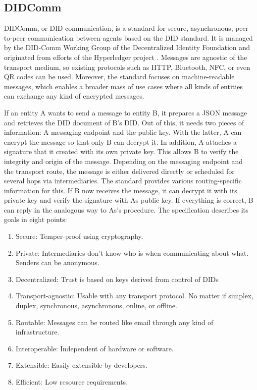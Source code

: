 		\subsection{DIDComm}
		
		DIDComm, or \ac{DID} communication, is a standard for secure, asynchronous, peer-to-peer communication between agents based on the \ac{DID} standard. It is managed by the \ac{DID}-Comm Working Group of the Decentralized Identity Foundation \cite{hardman_didcomm_2021} and originated from efforts of the Hyperledger project \cite{hardman_aries_2019}. Messages are agnostic of the transport medium, so existing protocols such as HTTP, Bluetooth, NFC, or even QR codes can be used.  Moreover, the standard focuses on machine-readable messages, which enables a broader mass of use cases where all kinds of entities can exchange any kind of encrypted messages. \cite[pp. 96-97]{preukschat_self-sovereign_2021}
		
		If an entity A wants to send a message to entity B, it prepares a JSON message and retrieves the \ac{DID} document of B's \ac{DID}. Out of this, it needs two pieces of information: A messaging endpoint and the public key. With the latter, A can encrypt the message so that only B can decrypt it. In addition, A attaches a signature that it created with its own private key. This allows B to verify the integrity and origin of the message. Depending on the messaging endpoint and the transport route, the message is either delivered directly or scheduled for several hops via intermediaries. The standard provides various routing-specific information for this. If B now receives the message, it can decrypt it with its private key and verify the signature with As public key. If everything is correct, B can reply in the analogous way to As's procedure. The specification describes its goals in eight points: \cite{hardman_didcomm_2021}
		
		\begin{enumerate}
		    \item Secure: Temper-proof using cryptography.
		    \item Private: Intermediaries don't know who is when communicating about what. Senders can be anonymous.
		    \item Decentralized: Trust is based on keys derived from control of \acp{DID}
		    \item Transport-agnostic: Usable with any transport protocol. No matter if simplex, duplex, synchronous, asynchronous, online, or offline.
		    \item Routable: Messages can be routed like email through any kind of infrastructure.
		    \item Interoperable: Independent of hardware or software.
		    \item Extensible: Easily extensible by developers.
		    \item Efficient: Low resource requirements.
		\end{enumerate}
		
